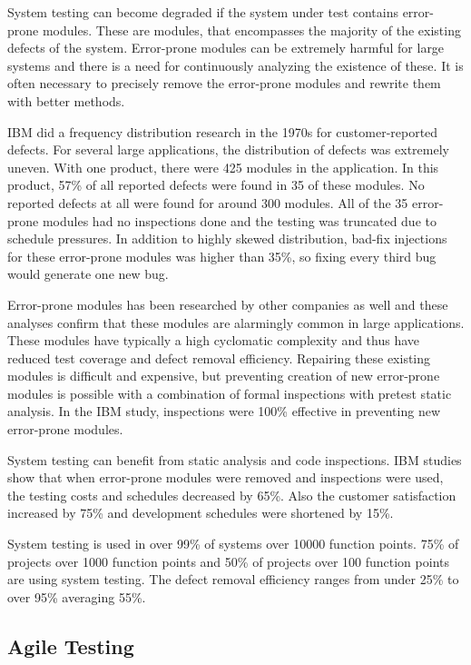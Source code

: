 System testing can become degraded if the system under test contains error-prone modules. These are modules, that encompasses the majority of the existing defects of the system. Error-prone modules can be extremely harmful for large systems and there is a need for continuously analyzing the existence of these. It is often necessary to precisely remove the error-prone modules and rewrite them with better methods.

IBM did a frequency distribution research in the 1970s for customer-reported defects. For several large applications, the distribution of defects was extremely uneven. With one product, there were 425 modules in the application. In this product, 57\% of all reported defects were found in 35 of these modules. No reported defects at all were found for around 300 modules. All of the 35 error-prone modules had no inspections done and the testing was truncated due to schedule pressures. In addition to highly skewed distribution, bad-fix injections for these error-prone modules was higher than 35\%, so fixing every third bug would generate one new bug.

Error-prone modules has been researched by other companies as well and these analyses confirm that these modules are alarmingly common in large applications. These modules have typically a high cyclomatic complexity and thus have reduced test coverage and defect removal efficiency. Repairing these existing modules is difficult and expensive, but preventing creation of new error-prone modules is possible with a combination of formal inspections with pretest static analysis. In the IBM study, inspections were 100\% effective in preventing new error-prone modules. 

System testing can benefit from static analysis and code inspections. IBM studies show that when error-prone modules were removed and inspections were used, the testing costs and schedules decreased by 65\%. Also the customer satisfaction increased by 75\% and development schedules were shortened by 15\%.

System testing is used in over 99\% of systems over 10000 function points. 75\% of projects over 1000 function points and 50\% of projects over 100 function points are using system testing. The defect removal efficiency ranges from under 25\% to over 95\% averaging 55\%.
 

 \subsection{Agile Testing}


